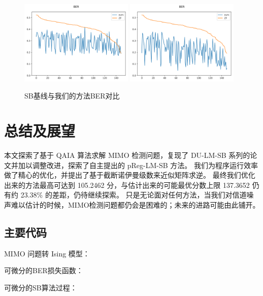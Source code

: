 \documentclass[withoutpreface,bwprint]{cumcmthesis}
\begin{document}
\begin{figure}
	\centering
	{\includegraphics[width=0.48\textwidth]{figures/solut-baseline.png}}
	{\includegraphics[width=0.48\textwidth]{figures/solut-ours.png}}
	\caption{SB基线与我们的方法BER对比}
	\label{fig:result-cmp}
\end{figure}


\section{总结及展望}

本文探索了基于 QAIA 算法求解 MIMO 检测问题，复现了 DU-LM-SB 系列的论文并加以调整改进，探索了自主提出的 pReg-LM-SB 方法。
我们为程序运行效率做了精心的优化，并提出了基于截断诺伊曼级数来近似矩阵求逆。
最终我们优化出来的方法最高可达到 105.2462 分，与估计出来的可能最优分数上限 137.3652 仍有约 23.38\% 的差距，仍待继续探索。
只是无论面对任何方法，当我们对信道噪声难以估计的时候，MIMO检测问题都仍会是困难的；未来的进路可能由此铺开。


\newpage

\nocite{*}


\newpage
\begin{appendices}

\section{主要代码}

MIMO 问题转 Ising 模型：



\newpage
可微分的BER损失函数：



\newpage
可微分的SB算法过程：



\end{appendices}
\end{document}
